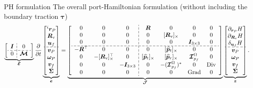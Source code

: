 \documentclass[aspectratio=169]{ISAE-Beamer}
\DeclareMathOperator*{\Grad}{Grad}
\DeclareMathOperator*{\Div}{Div}
\newcommand{\crmat}[1]{\ensuremath{[#1]_{\times}}}
\begin{document}
\begin{frame}{PH formulation}
The overall port-Hamiltonian formulation (without including the boundary traction $\bm{\tau}$)
\begin{equation*}
\setlength{\dashlinegap}{2pt}
\underbrace{
{\left[ \begin{array}{c:c}
\bm{I} & 0 \\
\hdashline
0 & \bm{\mathcal{M}} \\
\end{array} \right]}
}_{\bm{\mathcal{E}}}
\diffp{}{t}
\underbrace{\begin{bmatrix}
^i \bm{r}_P \\ \bm{R}_{\text{v}} \\ \bm{u}_f \\\hdashline  \bm{v}_P \\ \bm\omega_P  \\ \bm{v}_f  \\ \bm\Sigma \\
\end{bmatrix}}_{\bm{e}} = 
\underbrace{
{\left[ \begin{array}{ccc:cccc}
0 & 0 & 0 &  \bm{R} & 0 & 0 & 0 \\
0 & 0 & 0 & 0 & \crmat{\bm{R}_{\text{v}}} & 0 & 0 \\
0 & 0 & 0 & 0 & 0 & \bm{I}_{3\times 3} & 0  \\ 
\hdashline
-\bm{R}^\top & 0 & 0 & 0 & \crmat{\widehat{\bm{p}}_t} & 0 & 0 \\
0 & -\crmat{\bm{R}_{\text{v}}}^\top & 0 & \crmat{\widehat{\bm{p}}_t} & \crmat{\widehat{\bm{p}}_r} & \bm{\mathcal{I}}_{p_f}^\Omega & 0 \\
0 & 0 & -\bm{I}_{3\times 3} & 0 & -(\bm{\mathcal{I}}_{p_f}^\Omega)^* & 0 & \Div \\
0 & 0 & 0 & 0 & 0 & \Grad & 0 \\
\end{array} \right]}
}_{\bm{\mathcal{J}}}
\underbrace{\begin{bmatrix}
\partial_{\bm{r}_P}H \\ \partial_{\bm{R}_\text{v}}H \\ \delta_{\bm{u}_f} H \\\hdashline  \bm{v}_P \\ \bm\omega_P  \\ \bm{v}_f  \\ \bm\Sigma \\
\end{bmatrix}}_{\bm{z}}.
\end{equation*} 

\end{frame}
\end{document}

